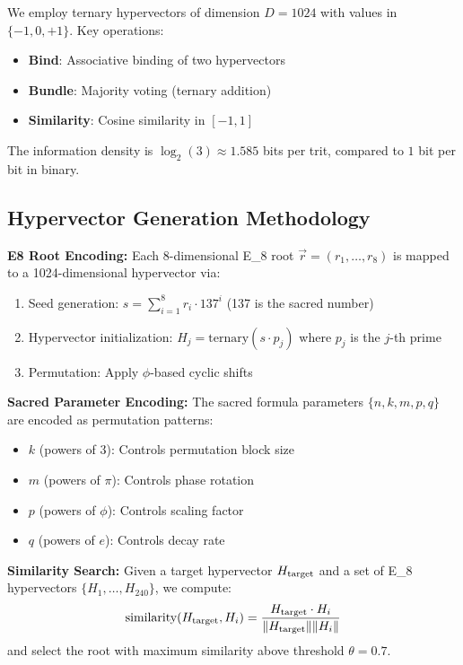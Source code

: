 \documentclass[12pt,a4paper]{article}
\newcommand{\EIGHT}{{\rm E}_8}
\begin{document}
We employ ternary hypervectors of dimension $D = 1024$ with values in $\{-1, 0, +1\}$. Key operations:

\begin{itemize}
\item \textbf{Bind}: Associative binding of two hypervectors
\item \textbf{Bundle}: Majority voting (ternary addition)
\item \textbf{Similarity}: Cosine similarity in $[-1, 1]$
\end{itemize}

The information density is $\log_2(3) \approx 1.585$ bits per trit, compared to $1$ bit per bit in binary.

\subsection{Hypervector Generation Methodology}

\textbf{E8 Root Encoding:} Each 8-dimensional \EIGHT{} root $\vec{r} = (r_1, \ldots, r_8)$ is mapped to a 1024-dimensional hypervector via:
\begin{enumerate}
\item Seed generation: $s = \sum_{i=1}^{8} r_i \cdot 137^i$ (137 is the sacred number)
\item Hypervector initialization: $H_j = \text{ternary}(s \cdot p_j)$ where $p_j$ is the $j$-th prime
\item Permutation: Apply $\phi$-based cyclic shifts
\end{enumerate}

\textbf{Sacred Parameter Encoding:} The sacred formula parameters $\{n, k, m, p, q\}$ are encoded as permutation patterns:
\begin{itemize}
\item $k$ (powers of 3): Controls permutation block size
\item $m$ (powers of $\pi$): Controls phase rotation
\item $p$ (powers of $\phi$): Controls scaling factor
\item $q$ (powers of $e$): Controls decay rate
\end{itemize}

\textbf{Similarity Search:} Given a target hypervector $H_{\rm target}$ and a set of \EIGHT{} hypervectors $\{H_1, \ldots, H_{240}\}$, we compute:
\begin{equation}
\text{similarity}(H_{\rm target}, H_i) = \frac{H_{\rm target} \cdot H_i}{\|H_{\rm target}\| \|H_i\|}
\end{equation}
and select the root with maximum similarity above threshold $\theta = 0.7$.
\end{document}
